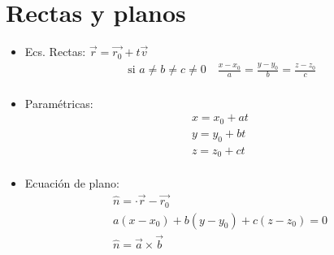 \documentclass{article}
\begin{document}
\section{Rectas y planos}
\begin{itemize}
    \item Ecs. Rectas: $\vec{r}= \vec{r_0} + t \vec{v}$ 
        \begin{align*}
            \text{  si  } a \neq b \neq c \neq 0    \quad \frac{x-x_0}{a} = \frac{y-y_0}{b} = \frac{z-z_0}{c}  \\ 
        \end{align*}
    
    \item Paramétricas:
        \begin{align*}
            x = x_0 +at \\ 
            y = y_0 +bt \\ 
            z = z_0 +ct \\ 
        \end{align*}
    
    \item Ecuación de plano:
        \begin{align*}
            \hat{n} = \cdot \vec{r}-\vec{r_0} \\ 
            a(x-x_0)+b(y-y_0) + c(z-z_0) = 0 \\ 
            \hat{n}= \vec{a} \times  \vec{b} \\ 
        \end{align*}
\end{itemize}
\end{document}
